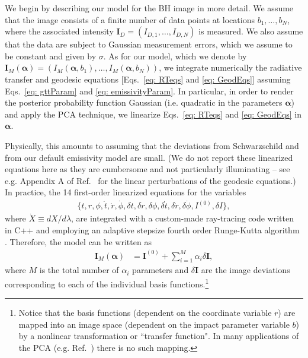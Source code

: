 \documentclass[%
nofootinbib,
 amsmath,amssymb,
 aps,
floatfix,
twocolumn
]{revtex4-2}
\begin{document}
We begin by describing our model for the BH image in more detail. We assume that the image consists of a finite number of data points at locations \(b_1, \dots, b_N\), where the associated intensity  \(\boldsymbol{I}_D = \left(I_{D, 1}, \dots, I_{D, N}\right)\) is measured. We also assume that the data are subject to Gaussian measurement errors, which we assume to be constant and given by $\sigma$. As for 
our model, which we denote by 
\(\boldsymbol{I}_M \left(\boldsymbol{\alpha}\right) = \left(I_M(\boldsymbol{\alpha}, b_1), \dots, I_M(\boldsymbol{\alpha}, b_N)\right)\), we integrate numerically the radiative transfer and geodesic equations [Eqs.~\eqref{eq: RTeqs} and \eqref{eq: GeodEqs}] assuming Eqs.~\eqref{eq: gttParam} and \eqref{eq: emissivityParam}. In particular, in order to render the posterior probability function Gaussian (i.e. quadratic in the parameters $\boldsymbol{\alpha}$) and apply the PCA technique, we linearize Eqs.~\eqref{eq: RTeqs} and \eqref{eq: GeodEqs} in $\boldsymbol{\alpha}$. 
 
Physically, this amounts to assuming that the deviations from Schwarzschild and from our default emissivity model are small. 
(We do not report these linearized equations here as they are cumbersome and not particularly illuminating -- see e.g. Appendix A of Ref.~\cite{Gralla:2012db} for the linear perturbations of the geodesic equations.) In practice, the  14 first-order linearized equations for the variables 
\begin{align}
\{t, r, \phi,\dot t, \dot r, \dot \phi,\delta t, \delta r, \delta \phi, \delta \dot t, \delta \dot r, \delta \dot \phi, I^{(0)}, \delta I\},
\end{align}
where \(\dot X \equiv dX/d\lambda\), are integrated with a custom-made ray-tracing code written in \textsc{C++} and  employing an adaptive stepsize fourth order Runge-Kutta algorithm \cite{Press:1992}. 
Therefore, the model can be written as
%
\begin{align} \label{eq: IModel}
    \boldsymbol{I}_M \left(\boldsymbol{\alpha}\right)  &= \boldsymbol{I}^{(0)} + \sum_{i = 1}^{M} \alpha_i \delta \boldsymbol{I},
\end{align}
%
where \(M\) is the total number of \(\alpha_i\) parameters and \(\delta \boldsymbol{I}\) are the image deviations corresponding to each of the individual basis functions.\footnote{Notice that the basis functions (dependent on the coordinate variable \(r\)) are mapped into an image space (dependent on the impact parameter variable \(b\)) by a nonlinear transformation or ``transfer function". In many applications of the PCA (e.g. Ref.~\cite{Pieroni:2020rob}) there is no such mapping.}
\end{document}
